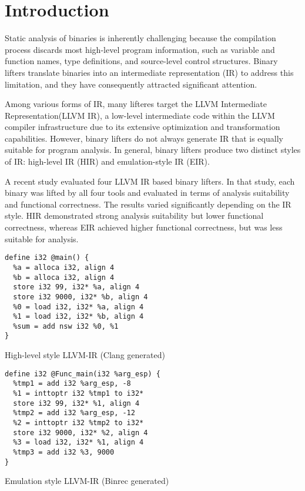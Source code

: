 \section{Introduction}
Static analysis of binaries is inherently challenging because the compilation
process discards most high-level program information, such as variable and
function names, type definitions, and source-level control structures. Binary
lifters translate binaries into an intermediate representation (IR) to address
this limitation, and they have consequently attracted significant attention.

Among various forms of IR, many lifteres target the LLVM Intermediate
Representation(LLVM IR), a low-level intermediate code within the LLVM compiler
infrastructure due to its extensive optimization and transformation
capabilities. However, binary lifters do not always generate IR that is equally
suitable for program analysis. In general, binary lifters produce two distinct
styles of IR: high-level IR (HIR) and emulation-style IR (EIR). 

A recent study evaluated four LLVM IR based binary lifters. In that study, each
binary was lifted by all four tools and evaluated in terms of analysis
suitability and functional correctness. The results varied significantly
depending on the IR style. HIR demonstrated strong analysis suitability but
lower functional correctness, whereas EIR achieved higher functional
correctness, but was less suitable for analysis.

\begin{listing}[ht]
\begin{verbatim}
define i32 @main() {
  %a = alloca i32, align 4
  %b = alloca i32, align 4
  store i32 99, i32* %a, align 4
  store i32 9000, i32* %b, align 4
  %0 = load i32, i32* %a, align 4
  %1 = load i32, i32* %b, align 4
  %sum = add nsw i32 %0, %1
}
\end{verbatim}
\caption{High-level style LLVM-IR (Clang generated)}
\label{lst:hir}
\end{listing}

\begin{listing}[ht]
\begin{verbatim}
define i32 @Func_main(i32 %arg_esp) {
  %tmp1 = add i32 %arg_esp, -8
  %1 = inttoptr i32 %tmp1 to i32*
  store i32 99, i32* %1, align 4
  %tmp2 = add i32 %arg_esp, -12
  %2 = inttoptr i32 %tmp2 to i32*
  store i32 9000, i32* %2, align 4
  %3 = load i32, i32* %1, align 4 
  %tmp3 = add i32 %3, 9000
}
\end{verbatim}
\caption{Emulation style LLVM-IR (Binrec generated)}
\label{lst:eir}
\end{listing}

